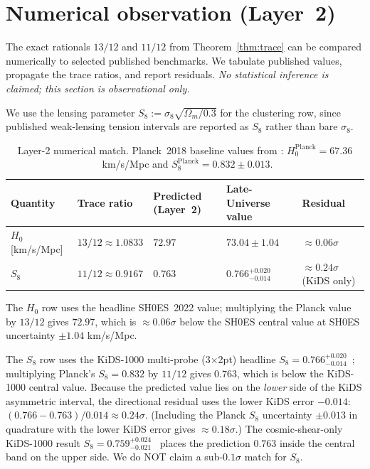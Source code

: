\documentclass[11pt]{article}
\newcommand{\Hzero}{H_0}
\newcommand{\sigeight}{\sigma_8}
\begin{document}
\section{Numerical observation (Layer~2)}\label{sec:observation}

The exact rationals $13/12$ and $11/12$ from
Theorem~\ref{thm:trace} can be compared numerically to selected
published benchmarks. We tabulate published values, propagate the
trace ratios, and report residuals. \emph{No statistical inference
is claimed; this section is observational only.}

We use the lensing parameter $S_8 := \sigeight \sqrt{\Omega_m / 0.3}$
for the clustering row, since published weak-lensing tension
intervals are reported as $S_8$ rather than bare $\sigeight$.

\begin{table}[h]
\centering
\caption{Layer-2 numerical match. Planck~2018 baseline values from
\citealp{Planck2020}: $\Hzero^\mathrm{Planck} = 67.36$~km/s/Mpc and
$S_8^\mathrm{Planck} = 0.832 \pm 0.013$.}
\label{tab:match}
\begin{tabular}{lllll}
\toprule
Quantity & Trace ratio & Predicted (Layer~2) & Late-Universe value & Residual \\
\midrule
$\Hzero$ [km/s/Mpc] & $13/12 \approx 1.0833$ & $72.97$ & $73.04 \pm 1.04$~\citep{Riess2022SH0ES} & $\approx 0.06\sigma$ \\
$S_8$               & $11/12 \approx 0.9167$ & $0.763$ & $0.766^{+0.020}_{-0.014}$~\citep{Heymans2021KiDS} & $\approx 0.24\sigma$ (KiDS only) \\
\bottomrule
\end{tabular}
\end{table}

The $\Hzero$ row uses the headline SH0ES~2022 value; multiplying the
Planck value by $13/12$ gives $72.97$, which is $\approx 0.06\sigma$
below the SH0ES central value at SH0ES uncertainty $\pm 1.04$
km/s/Mpc.

The $S_8$ row uses the KiDS-1000 multi-probe (3$\times$2pt) headline
$S_8 = 0.766^{+0.020}_{-0.014}$~\citep{Heymans2021KiDS}; multiplying
Planck's $S_8 = 0.832$ by $11/12$ gives $0.763$, which is below the
KiDS-1000 central value. Because the predicted value lies on the
\emph{lower} side of the KiDS asymmetric interval, the directional
residual uses the lower KiDS error $-0.014$:
$(0.766 - 0.763)/0.014 \approx 0.24\sigma$. (Including the Planck
$S_8$ uncertainty $\pm 0.013$ in quadrature with the lower KiDS error
gives $\approx 0.18\sigma$.) The cosmic-shear-only KiDS-1000 result
$S_8 = 0.759^{+0.024}_{-0.021}$~\citep{Asgari2021KiDSCS} places the
prediction $0.763$ inside the central band on the upper side. We do
NOT claim a sub-$0.1\sigma$ match for $S_8$.
\end{document}
